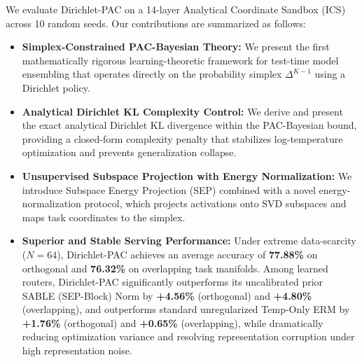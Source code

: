 We evaluate Dirichlet-PAC on a 14-layer Analytical Coordinate Sandbox (ICS) across 10 random seeds. Our contributions are summarized as follows:
\begin{itemize}
    \item \textbf{Simplex-Constrained PAC-Bayesian Theory:} We present the first mathematically rigorous learning-theoretic framework for test-time model ensembling that operates directly on the probability simplex $\Delta^{K-1}$ using a Dirichlet policy.
    \item \textbf{Analytical Dirichlet KL Complexity Control:} We derive and present the exact analytical Dirichlet KL divergence within the PAC-Bayesian bound, providing a closed-form complexity penalty that stabilizes log-temperature optimization and prevents generalization collapse.
    \item \textbf{Unsupervised Subspace Projection with Energy Normalization:} We introduce Subspace Energy Projection (SEP) combined with a novel energy-normalization protocol, which projects activations onto SVD subspaces and maps task coordinates to the simplex.
    \item \textbf{Superior and Stable Serving Performance:} Under extreme data-scarcity ($N=64$), Dirichlet-PAC achieves an average accuracy of \textbf{77.88\%} on orthogonal and \textbf{76.32\%} on overlapping task manifolds. Among learned routers, Dirichlet-PAC significantly outperforms its uncalibrated prior SABLE (SEP-Block) Norm by \textbf{+4.56\%} (orthogonal) and \textbf{+4.80\%} (overlapping), and outperforms standard unregularized Temp-Only ERM by \textbf{+1.76\%} (orthogonal) and \textbf{+0.65\%} (overlapping), while dramatically reducing optimization variance and resolving representation corruption under high representation noise.
\end{itemize}
